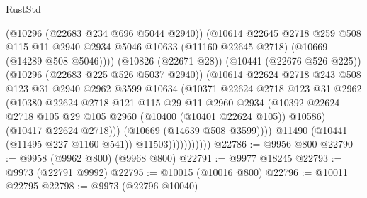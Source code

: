 \begin{lexlean}{RustStd}
\begin{coremodule}
                              (@10296 (@22683 @234 @696 @5044 @2940))
                              (@10614
                                @22645
                                @2718
                                @259
                                @508
                                @115
                                @11
                                @2940
                                @2934
                                @5046
                                @10633
                                (@11160 @22645 @2718)
                                (@10669 (@14289 @508 @5046))))
                            (@10826 (@22671 @28))
                            (@10441 (@22676 @526 @225))
                            (@10296 (@22683 @225 @526 @5037 @2940))
                            (@10614
                              @22624
                              @2718
                              @243
                              @508
                              @123
                              @31
                              @2940
                              @2962
                              @3599
                              @10634
                              (@10371
                                @22624
                                @2718
                                @123
                                @31
                                @2962
                                (@10380
                                  @22624
                                  @2718
                                  @121
                                  @115
                                  @29
                                  @11
                                  @2960
                                  @2934
                                  (@10392
                                    @22624
                                    @2718
                                    @105
                                    @29
                                    @105
                                    @2960
                                    (@10400 (@10401 @22624 @105))
                                    @10586)
                                  (@10417 @22624 @2718)))
                              (@10669 (@14639 @508 @3599))))
                          @11490
                          (@10441 (@11495 @227 @1160 @541))
                          @11503)))))))))))
@22786 := @9956 @800
@22790 := @9958 (@9962 @800) (@9968 @800)
@22791 := @9977 @18245
@22793 := @9973 (@22791 @9992)
@22795 := @10015 (@10016 @800)
@22796 := @10011 @22795
@22798 := @9973 (@22796 @10040)

\end{coremodule}
\end{lexlean}
